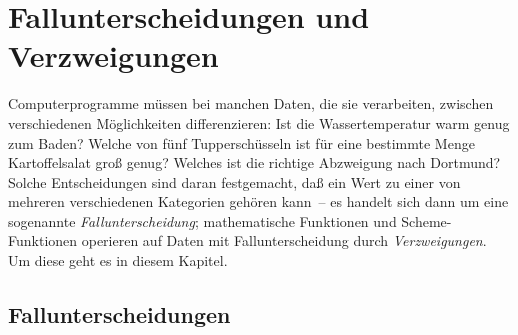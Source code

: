 

\chapter{Fallunterscheidungen und Verzweigungen}
\label{cha:conditionals}

Computerprogramme müssen bei manchen Daten, die sie
verarbeiten, zwischen verschiedenen Möglichkeiten differenzieren: Ist
die Wassertemperatur warm genug zum Baden?  Welche von fünf
Tupperschüsseln ist für eine bestimmte Menge Kartoffelsalat groß
genug?  Welches ist die richtige Abzweigung nach Dortmund?  Solche
Entscheidungen sind daran festgemacht, daß ein Wert zu einer von mehreren
verschiedenen 
Kategorien gehören kann~-- es handelt sich dann um eine sogenannte
\textit{Fallunterscheidung}; 
mathematische Funktionen und Scheme-Funktionen operieren auf Daten mit
Fallunterscheidung durch \textit{Verzweigungen}.
Um diese geht es in diesem Kapitel.

\section{Fallunterscheidungen}
\label{sec:fallunterscheidungen}

